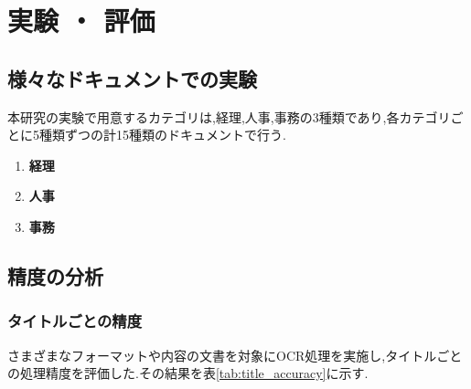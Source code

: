\chapter{実験 ・ 評価}
\label{ch:exp}
\quad

\section{様々なドキュメントでの実験}
\label{sec:exp_doc}

本研究の実験で用意するカテゴリは,経理,人事,事務の3種類であり,各カテゴリごとに5種類ずつの計15種類のドキュメントで行う.
\begin{enumerate}
    \item \textbf{経理}
    \item \textbf{人事}
    \item \textbf{事務}
\end{enumerate}

\section{精度の分析}
\label{sec:exp_anal}

\subsection{タイトルごとの精度}
\label{subsec:title}

さまざまなフォーマットや内容の文書を対象にOCR処理を実施し,タイトルごとの処理精度を評価した.その結果を表\ref{tab:title_accuracy}に示す.

